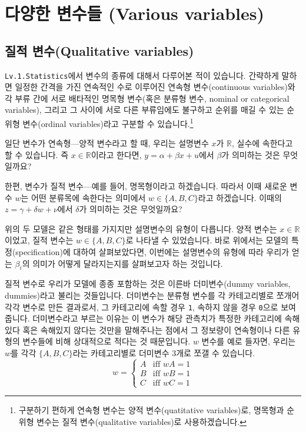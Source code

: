 \documentclass[
]{book}
\begin{document}
\hypertarget{uxb2e4uxc591uxd55c-uxbcc0uxc218uxb4e4-various-variables}{%
\section{다양한 변수들 (Various variables)}\label{uxb2e4uxc591uxd55c-uxbcc0uxc218uxb4e4-various-variables}}

\hypertarget{uxc9c8uxc801-uxbcc0uxc218qualitative-variables}{%
\subsection{질적 변수(Qualitative variables)}\label{uxc9c8uxc801-uxbcc0uxc218qualitative-variables}}

\texttt{Lv.1.Statistics}에서 변수의 종류에 대해서 다루어본 적이 있습니다. 간략하게 말하면 일정한 간격을 가진 연속적인 수로 이루어진 연속형 변수(continuous variables)와 각 부류 간에 서로 배타적인 명목형 변수(혹은 분류형 변수, nominal or categorical variables), 그리고 그 사이에 서로 다른 부류임에도 불구하고 순위를 매길 수 있는 순위형 변수(ordinal variables)라고 구분할 수 있습니다.\footnote{구분하기 편하게 연속형 변수는 양적 변수(quatitative variables)로, 명목형과 순위형 변수는 질적 변수(qualitative variables)로 사용하겠습니다.}

일단 변수가 연속형---양적 변수라고 할 때, 우리는 설명변수 \(x\)가 \(\mathbb{R}\), 실수에 속한다고 할 수 있습니다. 즉 \(x\in\mathbb{R}\)이라고 한다면, \(y = \alpha + \beta x + u\)에서 \(\beta\)가 의미하는 것은 무엇일까요?

한편, 변수가 질적 변수---예를 들어, 명목형이라고 하겠습니다. 따라서 이때 새로운 변수 \(w\)는 어떤 분류목에 속한다는 의미에서 \(w\in\{A, B, C\}\)라고 하겠습니다. 이때의 \(z = \gamma + \delta w + \nu\)에서 \(\delta\)가 의미하는 것은 무엇일까요?

위의 두 모델은 같은 형태를 가지지만 설명변수의 유형이 다릅니다. 양적 변수는 \(x \in \mathbb{R}\)이었고, 질적 변수는 \(w \in \{A,B,C\}\)로 나타낼 수 있었습니다. 바로 위에서는 모델의 특정(specification)에 대하여 살펴보았다면, 이번에는 설명변수의 유형에 따라 우리가 얻는 \(\beta_i\)의 의미가 어떻게 달라지는지를 살펴보고자 하는 것입니다.

질적 변수로 우리가 모델에 종종 포함하는 것은 이른바 더미변수(dummy variables, dummies)라고 불리는 것들입니다. 더미변수는 분류형 변수를 각 카테고리별로 쪼개어 각각 변수로 만든 결과로서, 그 카테고리에 속할 경우 \texttt{1}, 속하지 않을 경우 \texttt{0}으로 보여줍니다. 더미변수라고 부르는 이유는 이 변수가 해당 관측치가 특정한 카테고리에 속해있다 혹은 속해있지 않다는 것만을 말해주나는 점에서 그 정보량이 연속형이나 다른 유형의 변수들에 비해 상대적으로 적다는 것 때문입니다. \(w\) 변수를 예로 들자면, 우리는 \(w\)를 각각 \(\{A,B,C\}\)라는 카테고리별로 더미변수 3개로 쪼갤 수 있습니다.
\begin{equation*}
  w =
    \begin{cases}
      A & \text{iff } wA = 1\\
      B & \text{iff } wB = 1\\
      C & \text{iff } wC = 1
    \end{cases}       
\end{equation*}
\end{document}
